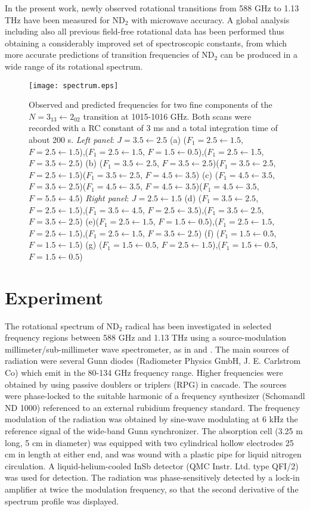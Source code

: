 \documentclass[twocolumn]{aastex61}
\begin{document}
In the present work, newly observed rotational transitions from 588 GHz to 1.13 THz have been measured for ND$_{2}$ with microwave accuracy.
A global analysis including also all previous field-free rotational data has been performed thus obtaining a considerably 
improved set of spectroscopic constants, from which more accurate predictions of transition frequencies of ND$_{2}$ can be 
produced in a wide range of its rotational spectrum.

\begin{figure*}[t]
	\centering
	\texttt{[image: spectrum.eps]}
	\caption{
		Observed and predicted frequencies for two fine components of the $N=3_{13}\gets2_{02}$ transition at 1015-1016 GHz. Both scans were recorded with a RC constant of 3 ms and a total integration time of about 200 s. \emph{Left panel}: $J=3.5\gets2.5$ (a) ($F_1=2.5\gets1.5$, $F=2.5\gets1.5$),($F_1=2.5\gets1.5$, $F=1.5\gets0.5$),($F_1=2.5\gets$1.5, $F=3.5\gets2.5$) (b) ($F_1=3.5\gets2.5$, $F=3.5\gets2.5$)($F_1=3.5\gets$2.5, $F=2.5\gets1.5$)($F_1=3.5\gets2.5$, $F=4.5\gets3.5$) (c) ($F_1=4.5\gets3.5$, $F=3.5\gets2.5$)($F_1=4.5\gets3.5$, $F=4.5\gets3.5$)($F_1=4.5\gets3.5$, $F=5.5\gets4.5$) \emph{Right panel}: $J=2.5\gets1.5$ (d) ($F_1=3.5\gets2.5$, $F=2.5\gets1.5$),($F_1=3.5\gets4.5$, $F=2.5\gets3.5$),($F_1=3.5\gets2.5$, $F=3.5\gets2.5$) (e)($F_1=2.5\gets1.5$, $F=1.5\gets0.5$),($F_1=2.5\gets1.5$, $F=2.5\gets1.5$),($F_1=2.5\gets1.5$, $F=3.5\gets2.5$) (f) ($F_1=1.5\gets0.5$, $F=1.5\gets1.5$) (g) ($F_1=1.5\gets0.5$, $F=2.5\gets1.5$),($F_1=1.5\gets0.5$, $F=1.5\gets0.5$)
	}\label{fig-1}
\end{figure*}

\section{Experiment}
The rotational spectrum of ND$_{2}$ radical has been investigated in selected frequency regions between 588 GHz and 1.13 THz using a
source-modulation millimeter/sub-millimeter wave spectrometer, as in \citet{Dor17} and \citet{Biz16}.
The main sources of radiation were several Gunn diodes (Radiometer Physics GmbH, J. E. Carlstrom Co) which emit 
in the 80-134 GHz frequency range. Higher frequencies were obtained by using passive doublers or triplers (RPG) in cascade.
The sources were phase-locked to the suitable harmonic of a frequency synthesizer (Schomandl ND 1000) referenced to an external 
rubidium frequency standard. The frequency modulation of the radiation was obtained by sine-wave modulating at 6 kHz the reference 
signal of the wide-band Gunn synchronizer.
The absorption cell (3.25 m long, 5 cm in diameter) was equipped with two cylindrical hollow electrodes 25 cm in length at either end, and was 
wound with a plastic pipe for liquid nitrogen circulation.
A liquid-helium-cooled InSb detector (QMC Instr. Ltd. type QFI/2) was used for detection. The radiation was phase-sensitively detected 
by a lock-in amplifier at twice the modulation frequency, so that the second derivative of the spectrum profile was displayed.
\end{document}
